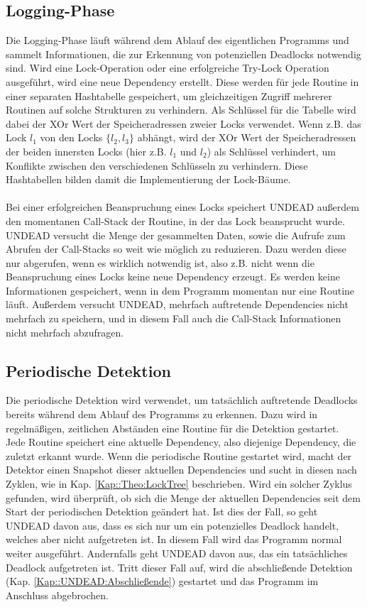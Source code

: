 \subsection{Logging-Phase}
Die Logging-Phase läuft während dem Ablauf des eigentlichen Programms und sammelt
Informationen, die zur Erkennung von potenziellen Deadlocks notwendig sind.  
Wird eine Lock-Operation
oder eine erfolgreiche Try-Lock Operation ausgeführt, wird eine neue Dependency 
erstellt. Diese werden für jede Routine in einer separaten 
Hashtabelle gespeichert, um gleichzeitigen Zugriff mehrerer Routinen auf solche 
Strukturen zu verhindern. Als Schlüssel für die Tabelle wird dabei der XOr 
Wert der Speicheradressen zweier Locks verwendet. Wenn z.B. das Lock $l_1$ 
von den Locks $\{l_2, l_3\}$ abhängt, wird der XOr Wert der Speicheradressen der 
beiden innersten Locks (hier z.B. $l_1$ und $l_2$) als Schlüssel verhindert, um 
Konflikte zwischen den verschiedenen Schlüsseln zu verhindern. Diese 
Hashtabellen bilden damit die Implementierung der Lock-Bäume.\\\\
Bei einer erfolgreichen Beanspruchung eines Locks speichert UNDEAD außerdem 
den momentanen Call-Stack der Routine, in der das Lock beansprucht wurde. 
UNDEAD versucht die Menge der gesammelten Daten, sowie die Aufrufe zum Abrufen
der Call-Stacks so weit wie möglich zu reduzieren.
Dazu werden diese nur abgerufen, wenn es wirklich notwendig ist, also z.B. 
nicht wenn die 
Beanspruchung eines Locks keine neue Dependency erzeugt. 
Es werden keine Informationen gespeichert, wenn in dem Programm momentan nur eine 
Routine läuft. Außerdem versucht UNDEAD, mehrfach auftretende
Dependencies nicht mehrfach zu speichern, und in diesem Fall auch die Call-Stack
Informationen nicht mehrfach abzufragen.
\subsection{Periodische Detektion}
Die periodische Detektion wird verwendet, um tatsächlich auftretende Deadlocks bereits während dem 
Ablauf des Programms zu erkennen. Dazu wird in regelmäßigen, zeitlichen 
Abständen eine Routine für die Detektion gestartet.\\
Jede Routine speichert eine 
aktuelle Dependency, also diejenige Dependency, die zuletzt erkannt wurde.
Wenn die periodische Routine gestartet wird, macht der Detektor einen Snapshot
dieser aktuellen Dependencies und sucht in diesen nach Zyklen, wie in Kap.
\ref{Kap::Theo:LockTree} beschrieben. Wird ein solcher Zyklus gefunden, wird 
überprüft, ob sich die Menge der aktuellen Dependencies seit dem Start der 
periodischen Detektion geändert hat. Ist dies der Fall, so geht UNDEAD davon aus,
dass es sich nur um ein potenzielles Deadlock handelt, welches aber nicht 
aufgetreten ist. In diesem Fall wird das Programm normal weiter ausgeführt.
Andernfalls geht UNDEAD davon aus, das ein tatsächliches Deadlock aufgetreten 
ist. Tritt dieser Fall auf, wird die 
abschließende Detektion (Kap. \ref{Kap::UNDEAD:Abschließende}) gestartet 
und das Programm im Anschluss abgebrochen. 
